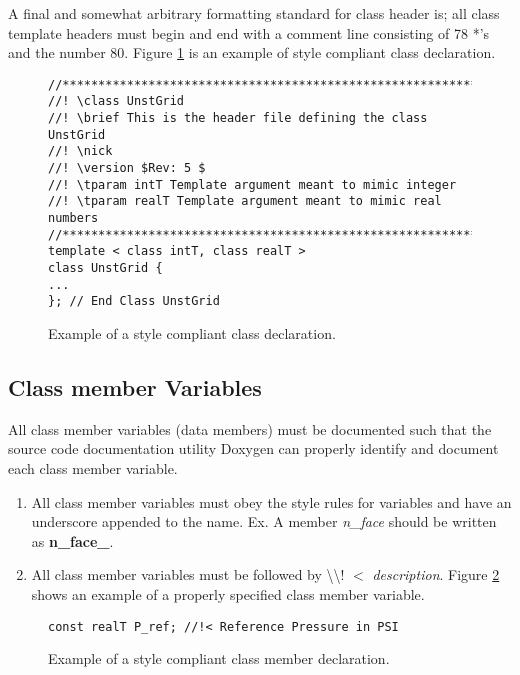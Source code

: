 \documentclass[letterpaper]{article}
\newcommand{\figref}[1]{Figure \ref{#1}}                %
\begin{document}
A final and somewhat arbitrary formatting standard for class header is; all class template headers must begin and end with a comment line consisting of 78 *'s and the number 80.
\figref{fig:class_style} is an example of style compliant class declaration.  
\begin{figure}[h!]
\begin{verbatim}
//****************************************************************************80
//! \class UnstGrid 
//! \brief This is the header file defining the class UnstGrid
//! \nick 
//! \version $Rev: 5 $
//! \tparam intT Template argument meant to mimic integer
//! \tparam realT Template argument meant to mimic real numbers
//****************************************************************************80
template < class intT, class realT >  
class UnstGrid {
...
}; // End Class UnstGrid
\end{verbatim}
\caption{Example of a style compliant class declaration.}
\label{fig:class_style}
\end{figure}
\subsection{Class member Variables}
All class member variables (data members) must be documented such that the source code documentation utility Doxygen can properly identify and document each class member variable.  
\begin{enumerate}
\item All class member variables must obey the style rules for variables and have an underscore appended to the name.  Ex. A member \textit{n\_face} should be written as \textbf{n\_face\_}.   
\item All class member variables must be followed  by \textbackslash\textbackslash ! $<$ \textit{description}.  \figref{fig:variable} shows an example of a properly specified class member variable.  
\end{enumerate}

\begin{figure}[h!]
\centering
\begin{verbatim}
const realT P_ref; //!< Reference Pressure in PSI 
\end{verbatim}
\caption{Example of a style compliant class member declaration.}
\label{fig:variable}
\end{figure}
\end{document}
